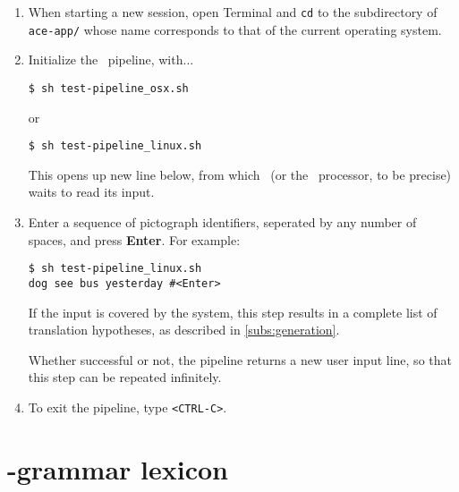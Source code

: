 \begin{enumerate}
    \item When starting a new session, open Terminal and
          \texttt{cd} to the subdirectory of \texttt{ace-app/}
          whose name corresponds to that of the current operating system.
    \item Initialize the \depicto\ pipeline, with...
  \begin{verbatim}
$ sh test-pipeline_osx.sh
  \end{verbatim}
  \vspace{-0.5cm}
    or
  \begin{verbatim}
$ sh test-pipeline_linux.sh
  \end{verbatim}
  \vspace{-0.5cm}
        This opens up new line below,
        from which \depicto\ (or the \ace\ processor, to be precise)
        waits to read its input.
  \item Enter a sequence of pictograph identifiers, seperated by any
        number of spaces, and press \textbf{Enter}. For example:
  \begin{verbatim}
$ sh test-pipeline_linux.sh
dog see bus yesterday #<Enter>
  \end{verbatim}
  \vspace{-0.5cm}
        If the input is covered by the system, this step results in
        a complete list of translation hypotheses, as described in \cref{subs:generation}.

        Whether successful or not, the pipeline returns a new
        user input line, so that this step can be repeated infinitely.

    \item To exit the pipeline, type \texttt{<CTRL-C>}.

\end{enumerate}



\chapter{\sclera-grammar lexicon}
\label{app:sclera-lexicon}

